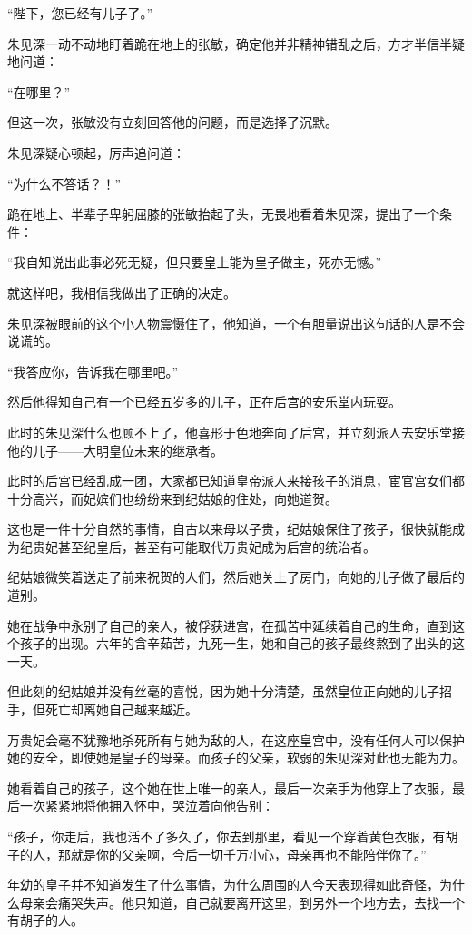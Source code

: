 \begin{multicols}{\theparacolNo}
“陛下，您已经有儿子了。”

朱见深一动不动地盯着跪在地上的张敏，确定他并非精神错乱之后，方才半信半疑地问道：

“在哪里？”

但这一次，张敏没有立刻回答他的问题，而是选择了沉默。

朱见深疑心顿起，厉声追问道：

“为什么不答话？！”

跪在地上、半辈子卑躬屈膝的张敏抬起了头，无畏地看着朱见深，提出了一个条件：

“我自知说出此事必死无疑，但只要皇上能为皇子做主，死亦无憾。”

就这样吧，我相信我做出了正确的决定。

朱见深被眼前的这个小人物震慑住了，他知道，一个有胆量说出这句话的人是不会说谎的。

“我答应你，告诉我在哪里吧。”

然后他得知自己有一个已经五岁多的儿子，正在后宫的安乐堂内玩耍。

此时的朱见深什么也顾不上了，他喜形于色地奔向了后宫，并立刻派人去安乐堂接他的儿子——大明皇位未来的继承者。

此时的后宫已经乱成一团，大家都已知道皇帝派人来接孩子的消息，宦官宫女们都十分高兴，而妃嫔们也纷纷来到纪姑娘的住处，向她道贺。

这也是一件十分自然的事情，自古以来母以子贵，纪姑娘保住了孩子，很快就能成为纪贵妃甚至纪皇后，甚至有可能取代万贵妃成为后宫的统治者。

纪姑娘微笑着送走了前来祝贺的人们，然后她关上了房门，向她的儿子做了最后的道别。

她在战争中永别了自己的亲人，被俘获进宫，在孤苦中延续着自己的生命，直到这个孩子的出现。六年的含辛茹苦，九死一生，她和自己的孩子最终熬到了出头的这一天。

但此刻的纪姑娘并没有丝毫的喜悦，因为她十分清楚，虽然皇位正向她的儿子招手，但死亡却离她自己越来越近。

万贵妃会毫不犹豫地杀死所有与她为敌的人，在这座皇宫中，没有任何人可以保护她的安全，即使她是皇子的母亲。而孩子的父亲，软弱的朱见深对此也无能为力。

她看着自己的孩子，这个她在世上唯一的亲人，最后一次亲手为他穿上了衣服，最后一次紧紧地将他拥入怀中，哭泣着向他告别：

“孩子，你走后，我也活不了多久了，你去到那里，看见一个穿着黄色衣服，有胡子的人，那就是你的父亲啊，今后一切千万小心，母亲再也不能陪伴你了。”

年幼的皇子并不知道发生了什么事情，为什么周围的人今天表现得如此奇怪，为什么母亲会痛哭失声。他只知道，自己就要离开这里，到另外一个地方去，去找一个有胡子的人。


\end{multicols}
